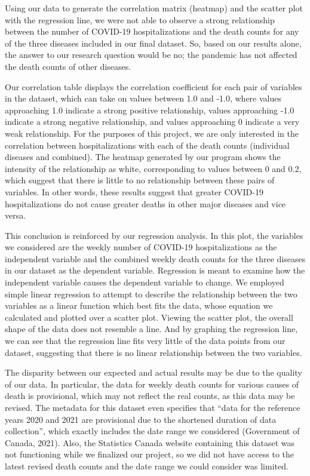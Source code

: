 \documentclass[fontsize=11pt]{article}
\begin{document}
\noindent
Using our data to generate the correlation matrix (heatmap) and the scatter plot with the regression line, we were not able to observe a strong relationship between the number of COVID-19 hospitalizations and the death counts for any of the three diseases included in our final dataset. So, based on our results alone, the answer to our research question would be no; the pandemic has not affected the death counts of other diseases.

Our correlation table displays the correlation coefficient for each pair of variables in the dataset, which can take on values between 1.0 and -1.0, where values approaching 1.0 indicate a strong positive relationship, values approaching -1.0 indicate a strong negative relationship, and values approaching 0 indicate a very weak relationship. For the purposes of this project, we are only interested in the correlation between hospitalizations with each of the death counts (individual diseases and combined). The heatmap generated by our program shows the intensity of the relationship as white, corresponding to values between 0 and 0.2, which suggest that there is little to no relationship between these pairs of variables. In other words, these results suggest that greater COVID-19 hospitalizations do not cause greater deaths in other major diseases and vice versa.

\noindent
This conclusion is reinforced by our regression analysis. In this plot, the variables we considered are the weekly number of COVID-19 hospitalizations as the independent variable and the combined weekly death counts for the three diseases in our dataset as the dependent variable. Regression is meant to examine how the independent variable causes the dependent variable to change. We employed simple linear regression to attempt to describe the relationship between the two variables as a linear function which best fits the data, whose equation we calculated and plotted over a scatter plot. Viewing the scatter plot, the overall shape of the data does not resemble a line. And by graphing the regression line, we can see that the regression line fits very little of the data points from our dataset, suggesting that there is no linear relationship between the two variables.

The disparity between our expected and actual results may be due to the quality of our data. In particular, the data for weekly death counts for various causes of death is provisional, which may not reflect the real counts, as this data may be revised.  The metadata for this dataset even specifies that “data for the reference years 2020 and 2021 are provisional due to the shortened duration of data collection”, which exactly includes the date range we considered (Government of Canada, 2021). Also, the Statistics Canada website containing this dataset was not functioning while we finalized our project, so we did not have access to the latest revised death counts and the date range we could consider was limited.
\end{document}
